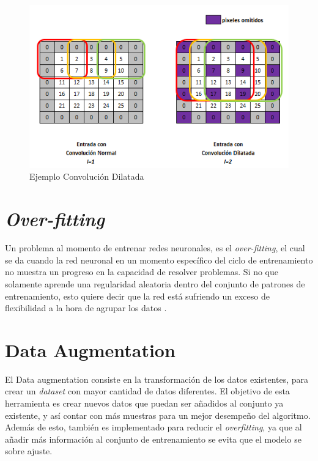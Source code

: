 \begin{figure}[ht]
	\centering
	\includegraphics[scale=0.6]{Figs/Convolucion_dilatada.png}
	\caption{Ejemplo Convolución Dilatada}
	\label{fig:cd}
\end{figure}

\section{\textit{Over-fitting}}

Un problema al momento de entrenar redes neuronales, es el \textit{over-fitting}, el cual se da cuando la red neuronal en un momento específico del ciclo de entrenamiento no muestra un progreso en la capacidad de resolver problemas. Si no que solamente aprende una regularidad aleatoria dentro del conjunto de patrones de entrenamiento, esto quiere decir que la red está sufriendo un exceso de flexibilidad a la hora de agrupar los datos \cite{jabbar2015methods}.


\section{Data Augmentation}
El Data augmentation consiste en la transformación de los datos existentes, para crear un \textit{dataset} con mayor cantidad de datos diferentes. El objetivo de esta herramienta es crear nuevos datos que puedan ser añadidos al conjunto ya existente, y así contar con más muestras para un mejor desempeño del algoritmo. Además de esto, también es implementado para reducir el \textit{overfitting}, ya que al añadir más información al conjunto de entrenamiento se evita que el modelo se sobre ajuste. \\


